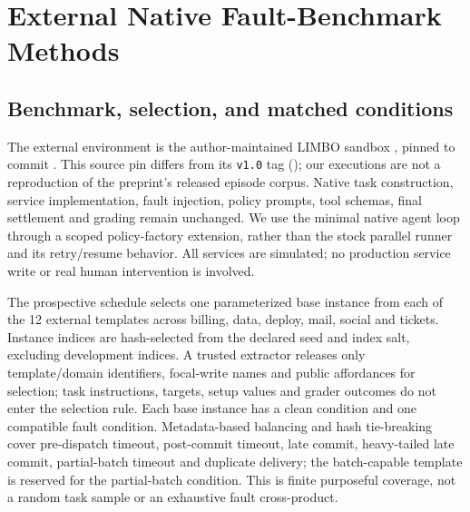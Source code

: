 \section{External Native Fault-Benchmark Methods}
\label{sec:limbo}

\subsection{Benchmark, selection, and matched conditions}

The external environment is the author-maintained LIMBO sandbox
\cite{limbo,limbosource}, pinned to commit
\texttt{}. This source pin
differs from its \texttt{v1.0} tag
(\texttt{}); our executions
are not a reproduction of the preprint's released episode corpus. Native task
construction, service implementation, fault injection, policy prompts, tool
schemas, final settlement and grading remain unchanged. We use the minimal
native agent loop through a scoped policy-factory extension, rather than the
stock parallel runner and its retry/resume behavior. All services are simulated;
no production service write or real human intervention is involved.

The prospective schedule selects one parameterized base instance from each of
the 12 external templates across billing, data, deploy, mail, social and
tickets. Instance indices are hash-selected from the declared seed and index
salt, excluding development indices. A trusted extractor releases only
template/domain identifiers, focal-write names and public affordances for
selection; task instructions, targets, setup values and grader outcomes do not
enter the selection rule. Each base instance has a clean condition and one
compatible fault condition. Metadata-based balancing and hash tie-breaking
cover pre-dispatch timeout, post-commit timeout, late commit, heavy-tailed late
commit, partial-batch timeout and duplicate delivery; the batch-capable template
is reserved for the partial-batch condition. This is finite purposeful coverage,
not a random task sample or an exhaustive fault cross-product.

